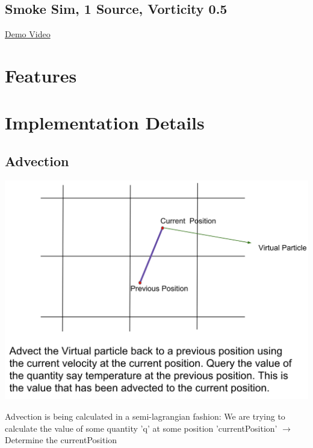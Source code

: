 \documentclass[11pt,letterpaper]{article}
\begin{document}
\subsection{Smoke Sim, 1 Source, Vorticity 0.5}

\href{https://vimeo.com/268137940}{Demo Video}


\section{Features}

\section{Implementation Details}

\subsection{Advection}

\includegraphics[width=\textwidth]{Advection.png}

Advection is being calculated in a semi-lagrangian fashion: \newline
	We are trying to calculate the value of some quantity 'q' at some position 'currentPosition' \newline
	\hspace{10mm} $\rightarrow$ Determine the currentPosition
	\newline \newline         
	
\end{document}
